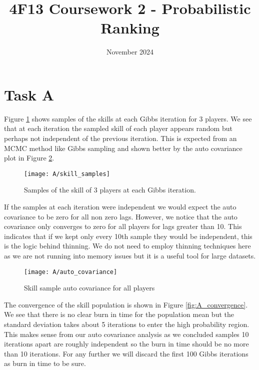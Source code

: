 \documentclass[11pt]{article}
\title{\vspace{-2cm}4F13 Coursework 2 - Probabilistic Ranking}
\author{}
\date{November 2024}
\begin{document}
% 

\setcounter{page}{1}

\maketitle

\section{Task A}

Figure \ref{fig:A_skill_samples} shows samples of the skills at each Gibbs iteration for 3 players. We see that at each iteration the sampled skill of each player appears random but perhaps not independent of the previous iteration. This is expected from an MCMC method like Gibbs sampling and shown better by the auto covariance plot in Figure \ref{fig:A_auto_covariance}. 

\begin{figure}[h]
    \centering
    \texttt{[image: A/skill\_samples]} 
    \caption{Samples of the skill of 3 players at each Gibbs iteration.}
    \label{fig:A_skill_samples}
\end{figure}

If the samples at each iteration were independent we would expect the auto covariance to be zero for all non zero lags. However, we notice that the auto covariance only converges to zero for all players for lags greater than 10. This indicates that if we kept only every 10th sample they would be independent, this is the logic behind thinning. We do not need to employ thinning techniques here as we are not running into memory issues but it is a useful tool for large datasets.

\begin{figure}[h]
    \centering
    \texttt{[image: A/auto\_covariance]} 
    \caption{Skill sample auto covariance for all players}
    \label{fig:A_auto_covariance}
\end{figure}

The convergence of the skill population is shown in Figure \ref{fig:A_convergence}. We see that there is no clear burn in time for the population mean but the standard deviation takes about 5 iterations to enter the high probability region. This makes sense from our auto covariance analysis as we concluded samples 10 iterations apart are roughly independent so the burn in time should be no more than 10 iterations. For any further we will discard the first 100 Gibbs iterations as burn in time to be sure.
\end{document}
